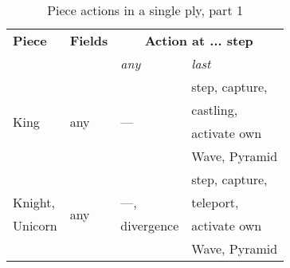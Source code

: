 \begin{table}[!h]
\centering
\begin{tabular}{ llll }
\toprule %
\textbf{Piece}              & \textbf{Fields}           & \multicolumn{2}{c}{ \textbf{Action at ... step} }         \\
                                                        \cmidrule{3-4} %
                            &                           & \emph{any}\footnotemark[1]    & \emph{last}               \\
\midrule %
\multirow{4}{*}{King}       & \multirow{4}{*}{any\footnotemark[2]}
                                                        & \multirow{4}{*}{---}          & step, capture,            \\
                            &                           &                               & castling,                 \\
                            &                           &                               & activate own              \\
                            &                           &                               & Wave, Pyramid             \\
\cmidrule{1-4} %
                            & \multirow{4}{*}{any\footnotemark[2]}
                                                        &                               & step, capture,            \\
Knight,                     &                           & ---\footnotemark[3],          & teleport,                 \\
Unicorn                     &                           & divergence\footnotemark[4]    & activate own              \\
                            &                           &                               & Wave, Pyramid             \\
\bottomrule %
\end{tabular}
\caption{Piece actions in a single ply, part 1}
\label{tbl:Appendix/Summary/Piece actions, part 1}
\end{table}

